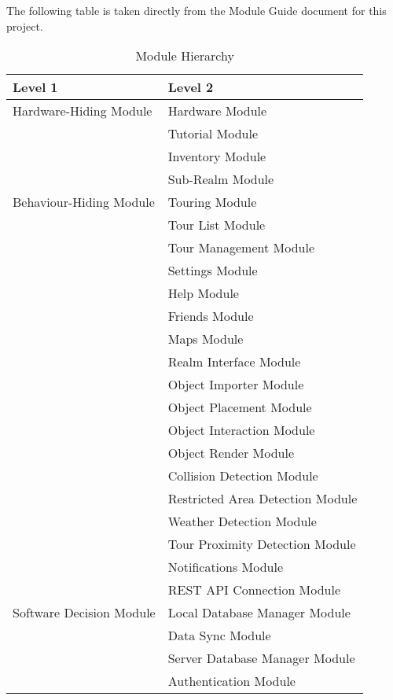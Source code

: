 \documentclass[12pt, titlepage]{article}
\begin{document}
The following table is taken directly from the Module Guide document for this project.


\begin{table}[h!]
\centering
\begin{tabular}{p{} p{}}
\toprule
\textbf{Level 1} & \textbf{Level 2}\\
\midrule

{Hardware-Hiding Module} & Hardware Module\\
\midrule

\multirow{7}{0.3\textwidth}{Behaviour-Hiding Module} & Tutorial Module\\
& Inventory Module\\
& Sub-Realm Module\\
& Touring Module\\
& Tour List Module\\
& Tour Management Module\\
& Settings Module\\
& Help Module\\
& Friends Module\\ 
& Maps Module\\
& Realm Interface Module\\
& Object Importer Module\\
& Object Placement Module\\
& Object Interaction Module\\
& Object Render Module\\
& Collision Detection Module\\
& Restricted Area Detection Module\\
& Weather Detection Module\\
& Tour Proximity Detection Module\\
& Notifications Module\\
\midrule

\multirow{3}{0.3\textwidth}{Software Decision Module} & REST API Connection Module\\
& Local Database Manager Module\\
& Data Sync Module\\
& Server Database Manager Module\\
& Authentication Module\\
\bottomrule

\end{tabular}
\caption{Module Hierarchy}
\label{TblMH}
\end{table}
\end{document}
